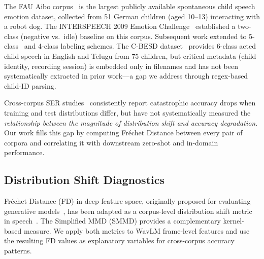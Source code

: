 The FAU Aibo corpus~\cite{batliner2011fau,steidl2009fau} is the largest
publicly available spontaneous child speech emotion dataset, collected from 51
German children (aged 10--13) interacting with a robot dog. The INTERSPEECH
2009 Emotion Challenge~\cite{schuller2009interspeech} established a two-class
(negative vs.\ idle) baseline on this corpus. Subsequent work extended to
5-class~\cite{steidl2011fau} and 4-class labeling schemes. The C-BESD
dataset~\cite{rao2024cbesd} provides 6-class acted child speech in English and Telugu from
75 children, but critical metadata (child identity, recording session) is
embedded only in filenames and has not been systematically extracted in prior
work---a gap we address through regex-based child-ID parsing.

Cross-corpus SER studies~\cite{schuller2010cross, latif2024cross}
consistently report catastrophic accuracy drops when training and test
distributions differ, but have not systematically measured the
\textit{relationship between the magnitude of distribution shift and accuracy
degradation}. Our work fills this gap by computing Fr\'{e}chet Distance between
every pair of corpora and correlating it with downstream zero-shot and
in-domain performance.

\subsection{Distribution Shift Diagnostics}

Fr\'{e}chet Distance (FD) in deep feature space, originally proposed for
evaluating generative models~\cite{heusel2017gans}, has been adapted as a
corpus-level distribution shift metric in speech~\cite{le2024dist}. The
Simplified MMD (SMMD) provides a complementary kernel-based measure. We apply
both metrics to WavLM frame-level features and use the resulting FD values as
explanatory variables for cross-corpus accuracy patterns.
